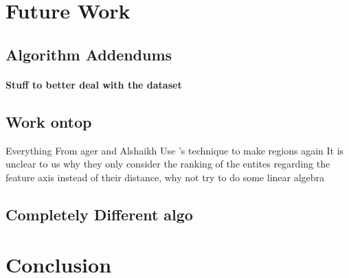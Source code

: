 
\section{Future Work}
\label{sec:futurework}

\subsection*{Algorithm Addendums}
\todo

\paragraph{Stuff to better deal with the dataset}
\todo

\subsection*{Work ontop}
Everything From ager and Alshaikh
Use \cite{Erk2009}'s technique to make regions again
It is unclear to us why they only consider the ranking of the entites regarding the feature axis instead of their distance, why not try to do some linear algebra
\todo



\subsection*{Completely Different algo}
\todo





\section{Conclusion}

